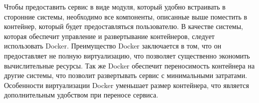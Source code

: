 Чтобы предоставить сервис в виде модуля, который удобно встраивать в сторонние системы, необходимо все компоненты, описанные выше поместить в контейнер, который будет предоставляться пользователю. В качестве системы, которая обеспечит управление и развертывание контейнеров, следует использовать Docker. Преимущество Docker заключается в том, что он предоставляет не полную виртуализацию, что позволяет существенно экономить вычислительные ресурсы. Так же Docker обеспечит переносимость контейнера на другие системы, что позволит развертывать сервис с минимальными затратами. Особенности виртуализации Docker уменьшает размер контейнера, что является дополнительным удобством при переносе сервиса.
